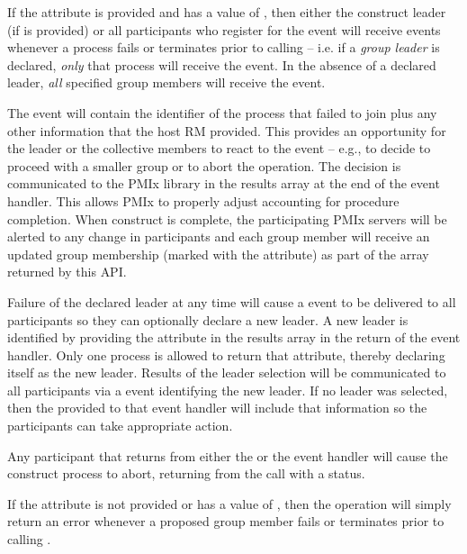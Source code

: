 If the  attribute is provided and has a value of , then either the construct leader (if  is provided) or all participants who register for the  event will receive events whenever a process fails or terminates prior to calling  – i.e. if a \emph{group leader} is declared, \textit{only} that process will receive the event. In the absence of a declared leader, \textit{all} specified group members will receive the event.

The event will contain the identifier of the process that failed to join plus any other information that the host \ac{RM} provided. This provides an opportunity for the leader or the collective members to react to the event – e.g., to decide to proceed with a smaller group or to abort the operation. The decision is communicated to the \ac{PMIx} library in the results array at the end of the event handler. This allows \ac{PMIx} to properly adjust accounting for procedure completion. When construct is complete, the participating \ac{PMIx} servers will be alerted to any change in participants and each group member will receive an updated group membership (marked with the  attribute) as part of the  array returned by this \ac{API}.

Failure of the declared leader at any time will cause a  event to be delivered to all participants so they can optionally declare a new leader. A new leader is identified by providing the  attribute in the results array in the return of the event handler. Only one process is allowed to return that attribute, thereby declaring itself as the new leader. Results of the leader selection will be communicated to all participants via a  event identifying the new leader. If no leader was selected, then the  provided to that event handler will include that information so the participants can take appropriate action.

Any participant that returns  from either the  or the  event handler will cause the construct process to abort, returning from the call with a  status.

If the  attribute is not provided or has a value of , then the  operation will simply return an error whenever a proposed group member fails or terminates prior to calling .

